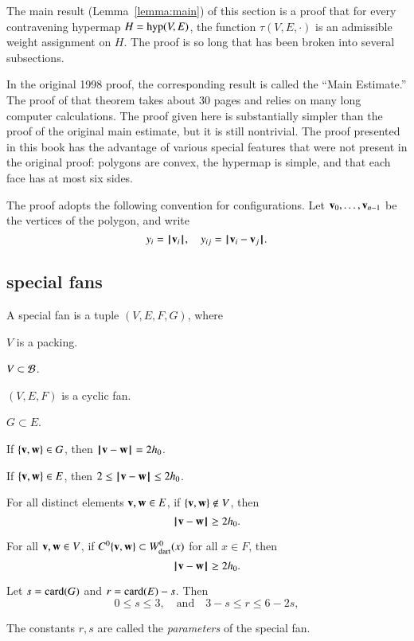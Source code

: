 The main result (Lemma~\ref{lemma:main}) of this section is a proof that for every contravening hypermap $H={\operatorname{hyp}}(V,E)$, the function $\tau(V,E,\cdot)$
is an admissible weight assignment on $H$.
The proof is so long that has been broken into several subsections.


\begin{remark}
In the original 1998 proof, the corresponding result
is called the ``Main Estimate.''  The proof of that 
theorem takes about 30 pages and relies on many
long computer calculations.  The proof given here
is substantially simpler than the proof of the original
main estimate, but
it is still nontrivial. The proof presented in this book has the advantage
of various special features that were not present in the original proof: 
polygons are convex, the hypermap
is simple, and that each face has at most six sides.
\end{remark}


The proof adopts the following convention for
configurations.  Let ${\mathbf v}_0,\ldots,{\mathbf v}_{n-1}$ be the vertices
of the polygon, and write
$$
y_i = {{\hskip0.1em|\hskip-0.15em|\hskip0.1em}{\mathbf v}_i{\hskip0.1em|\hskip-0.15em|\hskip0.1em}},\quad y_{ij} = {\hskip0.1em|\hskip-0.15em|\hskip0.1em}{\mathbf v}_i -  {\mathbf v}_j{\hskip0.1em|\hskip-0.15em|\hskip0.1em}.
$$
%


\subsection{special fans}
%

\begin{definition}
A special fan is a tuple $(V,E,F,G)$, where
\begin{nomerate}
\item {} $V$ is a packing.
\item {} $V\subset {\mathcal B}$.
\item {} $(V,E,F)$ is a cyclic fan.
\item {} $G\subset E$.
\item {} If $\{{\mathbf v},{\mathbf w}\}\in G$, then ${\hskip0.1em|\hskip-0.15em|\hskip0.1em}{\mathbf v} - {\mathbf w}{\hskip0.1em|\hskip-0.15em|\hskip0.1em}=2{h_0}$.
\item {} If $\{{\mathbf v},{\mathbf w}\}\in E$, then $2\le {\hskip0.1em|\hskip-0.15em|\hskip0.1em}{\mathbf v} - {\mathbf w}{\hskip0.1em|\hskip-0.15em|\hskip0.1em}\le 2{h_0}$.
\item {} For all distinct elements ${\mathbf v},{\mathbf w}\in E$, if
$\{{\mathbf v},{\mathbf w}\}\not\in V$, then $${\hskip0.1em|\hskip-0.15em|\hskip0.1em}{\mathbf v} - {\mathbf w}{\hskip0.1em|\hskip-0.15em|\hskip0.1em}\ge 2{h_0}.$$
\item {}  For all ${\mathbf v},{\mathbf w}\in V$, if $C^0\{{\mathbf v},{\mathbf w}\}\subset W^0_{\text{dart}}(x)$ for all $x\in F$, then 
   $${\hskip0.1em|\hskip-0.15em|\hskip0.1em}{\mathbf v} - {\mathbf w}{\hskip0.1em|\hskip-0.15em|\hskip0.1em}\ge 2{h_0}.$$
\item {} %
 Let      $s={\operatorname{card}}(G)$ and $r={\operatorname{card}}(E) - s$.  Then
$$0\le s \le 3,\quad\text{and}\quad3-s \le r \le 6 - 2s,$$
\end{nomerate}
The constants $r,s$ are called the {\it parameters} of the special fan.
\end{definition}



